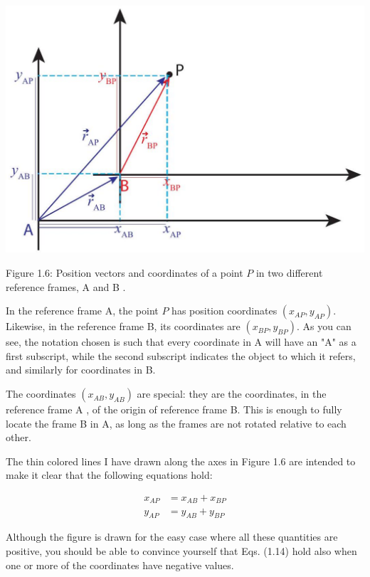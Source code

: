\documentclass[10pt]{article}
\begin{document}
\begin{center}
\includegraphics[max width=\textwidth]{2024_09_14_9969b06773f10b6936e8g-033}
\end{center}

Figure 1.6: Position vectors and coordinates of a point $P$ in two different reference frames, A and B .

In the reference frame A, the point $P$ has position coordinates $\left(x_{A P}, y_{A P}\right)$. Likewise, in the reference frame B, its coordinates are $\left(x_{B P}, y_{B P}\right)$. As you can see, the notation chosen is such that every coordinate in A will have an "A" as a first subscript, while the second subscript indicates the object to which it refers, and similarly for coordinates in B.

The coordinates $\left(x_{A B}, y_{A B}\right)$ are special: they are the coordinates, in the reference frame A , of the origin of reference frame B. This is enough to fully locate the frame B in A, as long as the frames are not rotated relative to each other.

The thin colored lines I have drawn along the axes in Figure 1.6 are intended to make it clear that the following equations hold:


\begin{align*}
x_{A P} & =x_{A B}+x_{B P} \\
y_{A P} & =y_{A B}+y_{B P} \tag{1.14}
\end{align*}


Although the figure is drawn for the easy case where all these quantities are positive, you should be able to convince yourself that Eqs. (1.14) hold also when one or more of the coordinates have negative values.
\end{document}

